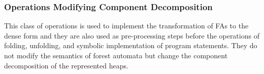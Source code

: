 \subsubsection*{Operations Modifying Component Decomposition}\label{sec:opdec}
This class of operations is used to implement the transformation of FAs to the dense form and they are also used as
pre-processing steps before the operations of folding, unfolding, and symbolic
implementation of program statements.
%
They do not modify the semantics of forest automata 
but change the component decomposition of the represented heaps.
%
